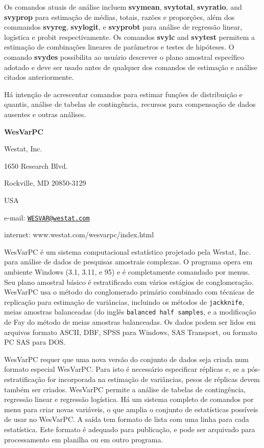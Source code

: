 \documentclass[]{book}
\numberwithin{example}{chapter}
\numberwithin{remark}{chapter}
\numberwithin{definition}{chapter}
\begin{document}
Os comandos atuais de análise incluem \textbf{svymean},
\textbf{svytotal}, \textbf{svyratio}, and \textbf{svyprop} para
estimação de médias, totais, razões e proporções, além dos commandos
\textbf{svyreg}, \textbf{svylogit}, e \textbf{svyprobt} para análise de
regressão linear, logística e probit respectivamente. Os comandos
\textbf{svylc} and \textbf{svytest} permitem a estimação de combinações
lineares de parâmetros e testes de hipóteses. O comando \textbf{svydes}
possibilita ao usuário descrever o plano amostral específico adotado e
deve ser usado antes de qualquer dos comandos de estimação e análise
citados anteriormente.

Há intenção de acrescentar comandos para estimar funções de distribuição
e quantis, análise de tabelas de contingência, recursos para compensação
de dados ausentes e outras análises.

\textbf{WesVarPC}

Westat, Inc.

1650 Research Blvd.

Rockville, MD 20850-3129

USA

e-mail: \href{mailto:WESVAR@westat.com}{\nolinkurl{WESVAR@westat.com}}

internet: www.westat.com/wesvarpc/index.html

WesVarPC é um sistema computacional estatístico projetado pela Westat,
Inc. para análise de dados de pesquisas amostrais complexas. O programa
opera em ambiente Windows (3.1, 3.11, e 95) e é completamente comandado
por menus. Seu plano amostral básico é estratificado com vários estágios
de conglomeração. WesVarPC usa o método do conglomerado primário
combinado com técnicas de replicação para estimação de variâncias,
incluindo os métodos de \texttt{jackknife}, meias amostras balanceadas
(do inglês \texttt{balanced\ half\ samples}, e a modificação de Fay do
método de meias amostras balanceadas. Os dados podem ser lidos em
arquivos formato ASCII, DBF, SPSS para Windows, SAS Transport, ou
formato PC SAS para DOS.

WesVarPC requer que uma nova versão do conjunto de dados seja criada num
formato especial WesVarPC. Para isto é necessário especificar réplicas
e, se a pós-estratificação for incorporada na estimação de variâncias,
pesos de réplicas devem também ser criados. WesVarPC permite a análise
de tabelas de contingência, regressão linear e regressão logística. Há
um sistema completo de comandos por menu para criar novas variáveis, o
que amplia o conjunto de estatísticas possíveis de usar no WesVarPC. A
saída tem formato de lista com uma linha para cada estatística. Este
formato é adequado para publicação, e pode ser arquivado para
processamento em planilha ou em outro programa.
\end{document}
